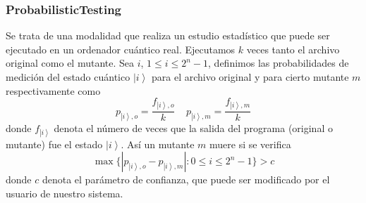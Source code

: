\documentclass{beamer}
\newcommand{\ket}[1]{\left|#1\right\rangle}
\begin{document}
\begin{frame}
	\frametitle{ProbabilisticTesting}
	
	Se trata de una modalidad que realiza un estudio estadístico que puede ser ejecutado en un ordenador cuántico real. Ejecutamos $k$ veces tanto el archivo original como el mutante. Sea $i$, $1\leq i\leq 2^n-1$, definimos las probabilidades de medición del estado cuántico $\ket i$ para el archivo original y para cierto  mutante $m$ respectivamente como
$$p_{\ket i,o}=\dfrac{f_{\ket i,o}}{k}\ \ \ \ \ p_{\ket i,m}=\dfrac{f_{\ket i,m}}{k}
$$
donde $f_{\ket i}$ denota el número de veces que la salida del programa (original o mutante) fue el estado $\ket i$. Así un mutante $m$ muere si se verifica
$$
\max \{|p_{\ket i,o}-p_{\ket i,m}|:0\leq i\leq 2^n - 1\}> c
$$
donde $c$ denota el parámetro de confianza, que puede ser modificado por el usuario de nuestro sistema.
\end{frame}
\end{document}
